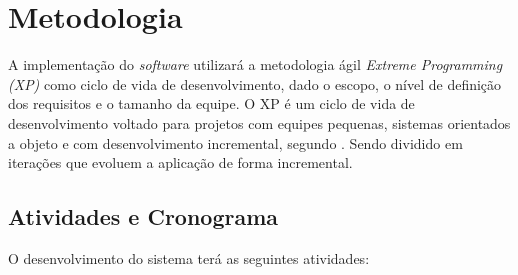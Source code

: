 \chapter[Metodologia]{Metodologia}

  A implementação do \textit{software} utilizará a metodologia ágil \textit{Extreme Programming (XP)} como ciclo de vida de desenvolvimento, dado o escopo, o nível de definição dos requisitos e o tamanho da equipe. O XP é um ciclo de vida de desenvolvimento voltado para projetos com equipes pequenas, sistemas orientados a objeto e com desenvolvimento incremental, segundo . Sendo dividido em iterações que evoluem a aplicação de forma incremental.

  \section[Atividades e Cronograma]{Atividades e Cronograma}

  O desenvolvimento do sistema terá as seguintes atividades:

